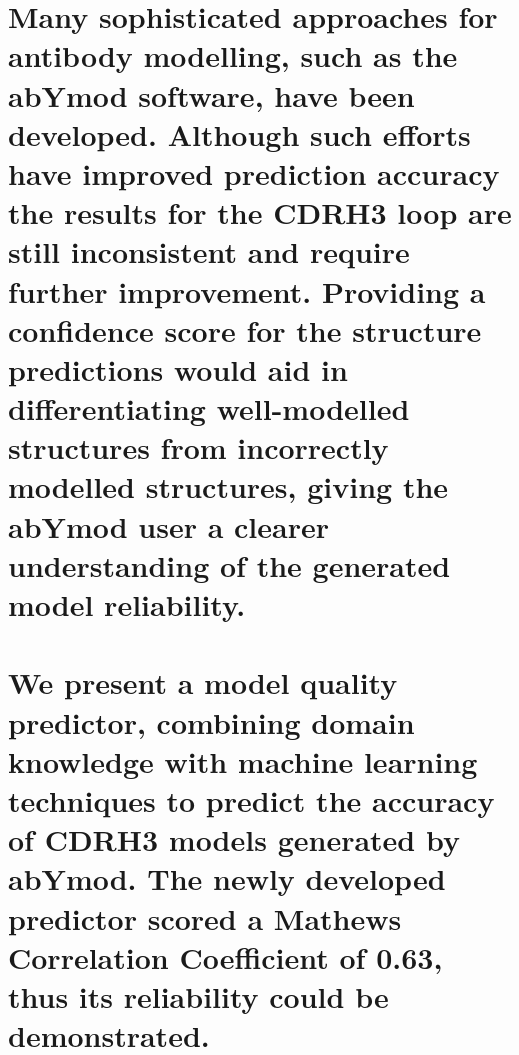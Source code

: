 \documentclass[
]{article}
\begin{document}
\hypertarget{many-sophisticated-approaches-for-antibody-modelling-such-as-the-abymod-software-have-been-developed.-although-such-efforts-have-improved-prediction-accuracy-the-results-for-the-cdrh3-loop-are-still-inconsistent-and-require-further-improvement.-providing-a-confidence-score-for-the-structure-predictions-would-aid-in-differentiating-well-modelled-structures-from-incorrectly-modelled-structures-giving-the-abymod-user-a-clearer-understanding-of-the-generated-model-reliability.}{%
\section{\texorpdfstring{Many sophisticated approaches for antibody
modelling, such as the abYmod software, have been developed. Although
such efforts have improved prediction accuracy the results for the CDRH3
loop are still inconsistent and require further improvement. Providing a
confidence score for the structure predictions would aid in
differentiating well-modelled structures from incorrectly modelled
structures, giving the abYmod user a clearer understanding of the
generated model reliability.
}{Many sophisticated approaches for antibody modelling, such as the abYmod software, have been developed. Although such efforts have improved prediction accuracy the results for the CDRH3 loop are still inconsistent and require further improvement. Providing a confidence score for the structure predictions would aid in differentiating well-modelled structures from incorrectly modelled structures, giving the abYmod user a clearer understanding of the generated model reliability. }}\label{many-sophisticated-approaches-for-antibody-modelling-such-as-the-abymod-software-have-been-developed.-although-such-efforts-have-improved-prediction-accuracy-the-results-for-the-cdrh3-loop-are-still-inconsistent-and-require-further-improvement.-providing-a-confidence-score-for-the-structure-predictions-would-aid-in-differentiating-well-modelled-structures-from-incorrectly-modelled-structures-giving-the-abymod-user-a-clearer-understanding-of-the-generated-model-reliability.}}

\hypertarget{we-present-a-model-quality-predictor-combining-domain-knowledge-with-machine-learning-techniques-to-predict-the-accuracy-of-cdrh3-models-generated-by-abymod.-the-newly-developed-predictor-scored-a-mathews-correlation-coefficient-of-0.63-thus-its-reliability-could-be-demonstrated.}{%
\section{We present a model quality predictor, combining domain
knowledge with machine learning techniques to predict the accuracy of
CDRH3 models generated by abYmod. The newly developed predictor scored a
Mathews Correlation Coefficient of 0.63, thus its reliability could be
demonstrated.}\label{we-present-a-model-quality-predictor-combining-domain-knowledge-with-machine-learning-techniques-to-predict-the-accuracy-of-cdrh3-models-generated-by-abymod.-the-newly-developed-predictor-scored-a-mathews-correlation-coefficient-of-0.63-thus-its-reliability-could-be-demonstrated.}}
\end{document}
